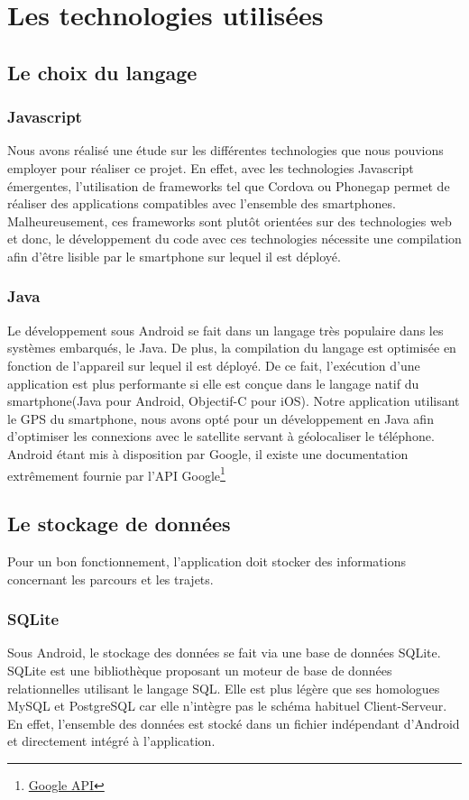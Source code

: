 \chapter{Les technologies utilisées}
\section{Le choix du langage}

\subsection{Javascript}
Nous avons réalisé une étude sur les différentes technologies que nous pouvions employer pour réaliser ce projet. En effet, avec les technologies Javascript émergentes, l'utilisation de frameworks tel que Cordova ou Phonegap permet de réaliser des applications compatibles avec l'ensemble des smartphones. Malheureusement, ces frameworks sont plutôt orientées sur des technologies web et donc, le développement du code avec ces technologies nécessite une compilation afin d'être lisible par le smartphone sur lequel il est déployé. 

\subsection{Java}
Le développement sous Android se fait dans un langage très populaire dans les systèmes embarqués, le Java. De plus, la compilation du langage est optimisée en fonction de l’appareil sur lequel il est déployé. De ce fait, l’exécution d'une application est plus performante si elle est conçue dans le langage natif du smartphone(Java pour Android, Objectif-C pour iOS). Notre application utilisant le GPS du smartphone, nous avons opté pour un développement en Java afin d'optimiser les connexions avec le satellite servant à géolocaliser le téléphone. Android étant mis à disposition par Google, il existe une documentation extrêmement fournie par l'API Google\footnote{\href{http://developer.android.com/index.html}{Google API}}

\section{Le stockage de données}
Pour un bon fonctionnement, l'application doit stocker des informations concernant les parcours et les trajets. 

\subsection{SQLite}
Sous Android, le stockage des données se fait via une base de données SQLite. SQLite est une bibliothèque proposant un moteur de base de données relationnelles utilisant le langage SQL. Elle est plus légère que ses homologues MySQL et PostgreSQL car elle n'intègre pas le schéma habituel Client-Serveur. En effet, l'ensemble des données est stocké dans un fichier indépendant d'Android et directement intégré à l'application.

